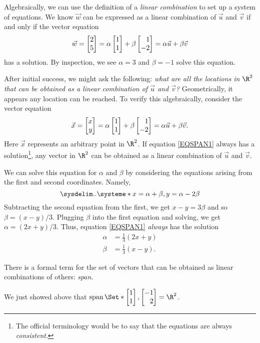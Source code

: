 Algebraically, we can use the definition of a \emph{linear combination} to set up a system of equations.
We know $\vec w$ can be expressed as a linear combination of $\vec u$ and $\vec v$ if and only if 
the vector equation
\[
	\vec w = \mat{2\\5}=\alpha\mat{1\\1}+\beta\mat{1\\-2}=\alpha \vec u+\beta \vec v
\]
has a solution. By inspection, we see $\alpha=3$ and $\beta=-1$ solve this equation.

After initial success, we might ask the following:
\emph{what are all the locations in $\R^2$ that can be obtained
as a linear combination of $\vec u$ and $\vec v$?} Geometrically, it appears
any location can be reached. To verify this algebraically, consider the vector equation
\begin{equation}
	\label{EQSPAN1}
	\vec x=\mat{x\\y} = \alpha\mat{1\\1}+\beta\mat{1\\-2} = \alpha\vec u+\beta\vec v.
\end{equation}
Here $\vec x$ represents an arbitrary point in $\R^2$. If equation \eqref{EQSPAN1} always
has a solution\footnote{ The official terminology would be to say that
the equations are always \emph{consistent}.}, any vector in $\R^2$ can be obtained as a linear combination of $\vec u$ and $\vec v$.

We can solve this equation for $\alpha$ and $\beta$ by considering the equations arising from the
first and second coordinates. Namely,
	\[
		\sysdelim..\systeme*{x=\alpha+\beta, y=\alpha-2\beta}
	\]
Subtracting the second equation from the first, we get $x-y=3\beta$ and so $\beta=(x-y)/3$. Plugging 
$\beta$ into the first equation and solving, we get $\alpha=(2x+y)/3$. Thus, equation \eqref{EQSPAN1}
\emph{always} has the solution
\begin{align*}
	\alpha &= \tfrac{1}{3}(2x+y)\\
	\beta &= \tfrac{1}{3}(x-y).
\end{align*}

There is a formal term for the set of vectors that can be obtained as linear combinations
of others: \emph{span}.


We just showed above that $\Span\Set*{\mat{1\\1},\mat{-1\\2}}=\R^2$.

